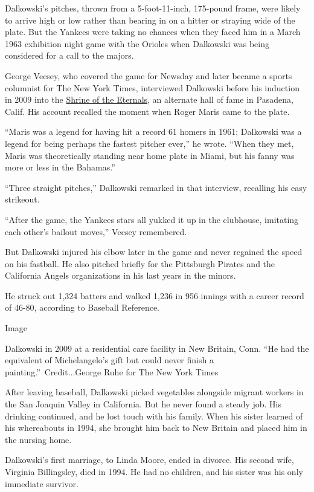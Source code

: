 Dalkowski's pitches, thrown from a 5-foot-11-inch, 175-pound frame, were
likely to arrive high or low rather than bearing in on a hitter or
straying wide of the plate. But the Yankees were taking no chances when
they faced him in a March 1963 exhibition night game with the Orioles
when Dalkowski was being considered for a call to the majors.

George Vecsey, who covered the game for Newsday and later became a
sports columnist for The New York Times, interviewed Dalkowski before
his induction in 2009 into the
\href{http://www.baseballreliquary.org/awards/shrine-of-the-eternals/}{Shrine
of the Eternals}, an alternate hall of fame in Pasadena, Calif. His
account recalled the moment when Roger Maris came to the plate.

``Maris was a legend for having hit a record 61 homers in 1961;
Dalkowski was a legend for being perhaps the fastest pitcher ever,'' he
wrote. ``When they met, Maris was theoretically standing near home plate
in Miami, but his fanny was more or less in the Bahamas.''

``Three straight pitches,'' Dalkowski remarked in that interview,
recalling his easy strikeout.

``After the game, the Yankees stars all yukked it up in the clubhouse,
imitating each other's bailout moves,'' Vecsey remembered.

But Dalkowski injured his elbow later in the game and never regained the
speed on his fastball. He also pitched briefly for the Pittsburgh
Pirates and the California Angels organizations in his last years in the
minors.

He struck out 1,324 batters and walked 1,236 in 956 innings with a
career record of 46-80, according to Baseball Reference.

Image

Dalkowski in 2009 at a residential care facility in New Britain, Conn.
``He had the equivalent of Michelangelo's gift but could never finish a
painting.''~Credit...George Ruhe for The New York Times

After leaving baseball, Dalkowski picked vegetables alongside migrant
workers in the San Joaquin Valley in California. But he never found a
steady job. His drinking continued, and he lost touch with his family.
When his sister learned of his whereabouts in 1994, she brought him back
to New Britain and placed him in the nursing home.

Dalkowski's first marriage, to Linda Moore, ended in divorce. His second
wife, Virginia Billingsley, died in 1994. He had no children, and his
sister was his only immediate survivor.

